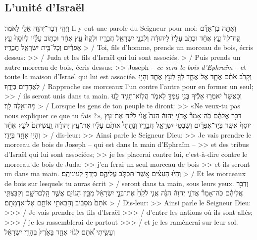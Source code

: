 \begin{paracol}[1]
  \subsection*{L'unité d'Israël}
  \verset
  {וַיְהִ֥י דְבַר־יְהוָ֖ה אֵלַ֥י לֵאמֹֽר׃}
  {Il y eut une parole du Seigneur pour moi:}
  \verset
  {וְאַתָּ֣ה בֶן־אָדָ֗ם קַח־לְךָ֙ עֵ֣ץ אֶחָ֔ד וּכְתֹ֤ב עָלָיו֙
    לִֽיהוּדָ֔ה וְלִבְנֵ֥י יִשְׂרָאֵ֖ל חֲבֵרָ֑יו
    וּלְקַח֙ עֵ֣ץ אֶחָ֔ד וּכְת֣וֹב עָלָ֗יו
    לְיוֹסֵף֙ עֵ֣ץ אֶפְרַ֔יִם וְכָל־בֵּ֥ית יִשְׂרָאֵ֖ל חֲבֵרָֽיו׃}
  {> / Toi, fils d’homme, prends un morceau de bois, écris dessus:
    >> / Juda et les fils d’Israël qui lui sont associés.
    > / Puis prends un autre morceau de bois, écris dessus:
    >> Joseph – \textit{ce sera le bois d’Ephraïm} – et toute la maison d’Israël qui lui est associée.}
  \verset
  {וְקָרַ֙ב אֹתָ֜ם אֶחָ֧ד אֶל־אֶחָ֛ד לְךָ֖ לְעֵ֣ץ אֶחָ֑ד
    וְהָי֥וּ לַאֲחָדִ֖ים בְּיָדֶֽךָ׃}
  {/ Rapproche ces morceaux l’un contre l’autre pour en former un seul;
    >> / ils seront unis dans ta main.}
  \verset
  {וְכַֽאֲשֶׁר֙ יֹאמְר֣וּ אֵלֶ֔יךָ בְּנֵ֥י עַמְּךָ֖ לֵאמֹ֑ר
    הֲלֽוֹא־תַגִּ֥יד לָ֖נוּ מָה־אֵ֥לֶּה לָּֽךְ׃}
  {> / Lorsque les gens de ton peuple te diront:
    >> «Ne veux-tu pas nous expliquer ce que tu fais ?»,}
  \verset
  {דַּבֵּ֣ר אֲלֵהֶ֗ם
    כֹּֽה־אָמַר֘ אֲדֹנָ֣י יְהוִה֒
    הִנֵּה֩ אֲנִ֙י לֹקֵ֜חַ אֶת־עֵ֤ץ יוֹסֵף֙ אֲשֶׁ֣ר בְּיַד־אֶפְרַ֔יִם
    וְשִׁבְטֵ֥י יִשְׂרָאֵ֖ל חֲבֵרָ֑יו
    וְנָתַתִּי֩ אוֹתָ֙ם עָלָ֜יו אֶת־עֵ֣ץ יְהוּדָ֗ה
    וַֽעֲשִׂיתִם֙ לְעֵ֣ץ אֶחָ֔ד
    וְהָי֥וּ אֶחָ֖ד בְּיָדִֽי׃}
  {> / dis-leur:
    >> Ainsi parle le Seigneur Dieu:
    >> Je vais prendre le morceau de bois de Joseph – qui est dans la main d’Ephraïm –
    >> et des tribus d’Israël qui lui sont associées;
    >> je les placerai contre lui, c’est-à-dire contre le morceau de bois de Juda;
    >> j’en ferai un seul morceau de bois
    >> et ils seront un dans ma main.}
  \verset
  {וְהָי֙וּ הָעֵצִ֜ים אֲֽשֶׁר־תִּכְתֹּ֧ב עֲלֵיהֶ֛ם
    בְּיָדְךָ֖ לְעֵינֵיהֶֽם׃}
  {> / Et les morceaux de bois sur lesquels tu auras écrit
    > / seront dans ta main, sous leurs yeux.}
  \verset
  {וְדַבֵּ֣ר אֲלֵיהֶ֗ם
    כֹּֽה־אָמַר֘ אֲדֹנָ֣י יְהוִה֒
    הִנֵּ֙ה אֲנִ֤י לֹקֵ֙חַ֙ אֶת־בְּנֵ֣י יִשְׂרָאֵ֔ל
    מִבֵּ֥ין הַגּוֹיִ֖ם אֲשֶׁ֣ר הָֽלְכוּ־שָׁ֑ם
    וְקִבַּצְתִּ֤י אֹתָם֙ מִסָּבִ֔יב
    וְהֵבֵאתִ֥י אוֹתָ֖ם אֶל־אַדְמָתָֽם׃}
  {> / Dis-leur:
    >> Ainsi parle le Seigneur Dieu:
    >>> / Je vais prendre les fils d’Israël
    >>> / d’entre les nations où ils sont allés;
    >>> / je les rassemblerai de partout
    >>> / et je les ramènerai sur leur sol.}
  \verset
  {וְעָשִׂ֣יתִי אֹ֠תָם לְג֙וֹי אֶחָ֤ד בָּאָ֙רֶץ֙ בְּהָרֵ֣י יִשְׂרָאֵ֔ל
}
\end{paracol}
